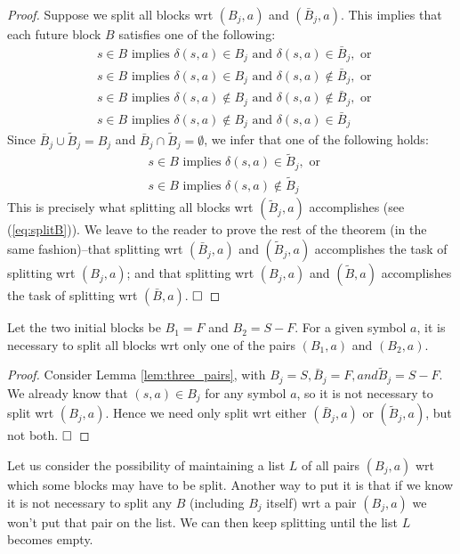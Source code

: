 \begin{proof}
	Suppose we split all blocks wrt $(B_j, a)$ and $(\bar{B}_j, a)$. This implies that each future block $B$ satisfies one of the following:
	\begin{align*}
    & s\in B \text{ implies } \delta(s,a)\in B_j \text{ and } \delta(s,a)\in \bar{B}_j, \text{ or } \\
    & s\in B \text{ implies } \delta(s,a)\in B_j \text{ and } \delta(s,a)\notin \bar{B}_j, \text{ or } \\
    & s\in B \text{ implies } \delta(s,a)\notin B_j \text{ and } \delta(s,a)\notin \bar{B}_j, \text{ or } \\
    & s\in B \text{ implies } \delta(s,a)\notin B_j \text{ and } \delta(s,a)\in \bar{B}_j
	\end{align*}
	Since $\bar{B}_j\cup\tilde{B}_j=B_j$ and $\bar{B}_j\cap\tilde{B}_j=\emptyset$, we infer that one of the following holds:
	\begin{align*}
	& s\in B \text{ implies } \delta(s,a)\in \tilde{B}_j, \text{ or } \\
	& s\in B \text{ implies } \delta(s,a)\notin \tilde{B}_j
	\end{align*}
	This is precisely what splitting all blocks wrt $(\tilde{B}_j,a)$ accomplishes (see (\ref{eq:splitB})). We leave to the reader to prove the rest of the theorem (in the same fashion)--that	splitting wrt $(\bar{B}_j,a)$ and $(\tilde{B}_j,a)$ accomplishes the task of splitting wrt $(B_j, a)$; and that splitting wrt $(B_j, a)$ and $(\tilde{B}, a)$ accomplishes the task of splitting wrt  $(\bar{B}, a)$. $\hfill\square$
\end{proof}

\begin{lemma}
	Let the two initial blocks be $B_1=F$ and $B_2=S-F$. For a given
	symbol $a$, it is necessary to split all blocks wrt only one of the pairs $(B_1, a)$ and $(B_2, a)$.
\end{lemma}

\begin{proof}
	Consider Lemma \ref{lem:three_pairs}, with $B_j=S, \bar{B}_j =F, and \tilde{B}_j=S-F$. We already know that $(s, a)\in B_j$ for any symbol $a$, so it is not necessary to split wrt $(B_j, a)$.
	Hence we need only split wrt either $(\bar{B}_j, a)$ or $(\tilde{B}_j, a)$, but not both. $\hfill\square$
\end{proof}

Let us consider the possibility of maintaining a list $L$ of all pairs $(B_j, a)$ wrt which some blocks may have to be split. Another way to put it is that if we know it is not necessary to split any $B$ (including $B_j$ itself) wrt a pair $(B_j, a)$ we won't put that pair on the list. We can then keep splitting until the list $L$ becomes empty.

